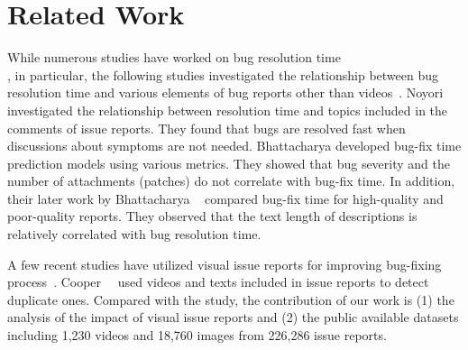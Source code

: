 \section{Related Work}
\label{sec:relate}
While numerous studies have worked on bug resolution time~\citep{DBLP:conf/msr/ChenNSH14}\citep{DBLP:journals/jss/GarciaSN18}\\\citep{DBLP:conf/sigsoft/JeongKZ09}\citep{DBLP:conf/icsm/KashiwaYKO14}\citep{DBLP:conf/msr/ZamanAH11}, 
in particular, the following studies investigated the relationship between bug resolution time and various elements of bug reports other than videos~\citep{DBLP:conf/msr/BhattacharyaN11}\citep{DBLP:conf/csmr/BhattacharyaUNK13}\citep{DBLP:journals/ieicetd/NoyoriWFKONT21}. 
Noyori~\et~\citep{DBLP:journals/ieicetd/NoyoriWFKONT21} investigated the relationship between resolution time and topics included in the comments of issue reports. 
They found that bugs are resolved fast when discussions about symptoms are not needed.  Bhattacharya \et \citep{DBLP:conf/msr/BhattacharyaN11} developed bug-fix
time prediction models using various metrics. They showed that bug severity and the number of attachments (patches) do not correlate with bug-fix time. In addition, their later work by Bhattacharya \et~\citep{DBLP:conf/csmr/BhattacharyaUNK13} compared bug-fix time for high-quality and poor-quality reports. They observed that the text length of descriptions is relatively correlated with bug resolution time. 

A few recent studies have utilized visual issue reports for improving bug-fixing process~\citep{DBLP:conf/icse/CooperBCMP21}. Cooper~\et~\citep{DBLP:conf/icse/CooperBCMP21} used videos and texts included in issue reports to detect duplicate ones. Compared with the study, the contribution of our work is (1) the analysis of the impact of visual issue reports and (2) the public available datasets including 1,230 videos and 18,760 images from 226,286 issue reports.
